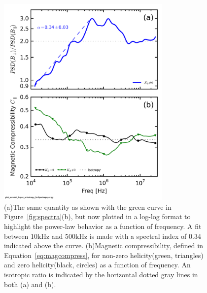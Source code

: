 \documentclass[aip,prl,amsmath,amssymb,reprint,superscriptaddress]{revtex4-1} %
\begin{document}
\begin{figure}[!htbp]
\centerline{
\includegraphics[width=8.5cm]{mag_compressibility_0helchan1t4prelim_1helchan1t6Kiydef_wratio_wfit}}
\caption{\label{fig:fitratio} (a)The same quantity as shown with the green curve in Figure~\ref{fig:spectra}(b), but now plotted in a log-log format to highlight the power-law behavior as a function of frequency. A fit between 10kHz and 500kHz is made with a spectral index of 0.34 indicated above the curve. (b)Magnetic compressibility, defined in Equation~\ref{eq:magcompress}, for non-zero helicity(green, triangles) and zero helicity(black, circles) as a function of frequency. An isotropic ratio is indicated by the horizontal dotted gray lines in both (a) and (b).}
\end{figure}
\end{document}

